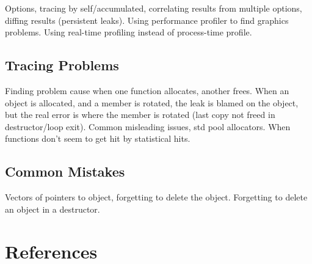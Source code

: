 \documentclass[10pt,a4paper,twocolumn]{article}
\begin{document}
Options, tracing by self/accumulated, correlating results from
multiple options, diffing results (persistent leaks).  Using
performance profiler to find graphics problems.  Using real-time
profiling instead of process-time profile.

\subsection{Tracing Problems}

Finding problem cause when one function allocates, another frees.
When an object is allocated, and a member is rotated, the leak is
blamed on the object, but the real error is where the member is
rotated (last copy not freed in destructor/loop exit).  Common
misleading issues, std pool allocators.  When functions don't seem to
get hit by statistical hits.

\subsection{Common Mistakes}

Vectors of pointers to object, forgetting to delete the object.
Forgetting to delete an object in a destructor.

\section{References}
\begin{thebibliography}{9}
\end{thebibliography}
\end{document}
